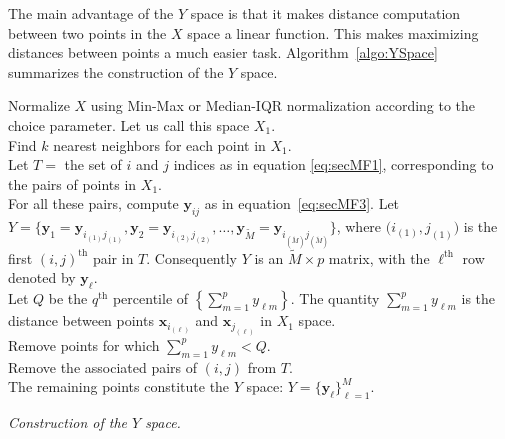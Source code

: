 \documentclass[letter,12pt]{article}
\begin{document}
The main advantage of the $Y$ space is that it makes distance computation between two points in the $X$ space a linear function. This makes maximizing distances between points a much easier task.
Algorithm~\ref{algo:YSpace} summarizes the construction of the $Y$ space.

\DontPrintSemicolon
\begin{algorithm}\fontsize{11}{12}\selectfont
	Normalize $X$ using { \color{blue} Min-Max or Median-IQR normalization according to the choice parameter}. Let us call this space $X_1$. \\
	{ \color{blue}Find $k$ nearest neighbors for each point in $X_1$.} \\
	Let $T = $ the set of $i$ and $j$ indices { \color{blue} as in equation \eqref{eq:secMF1}},  corresponding to the pairs of points in $X_1$. \\
	{ \color{blue} For all these pairs, compute $\bm{y}_{ij}$ as in equation~\eqref{eq:secMF3}.} Let $Y =\big\{ \bm{y}_{1} =\bm{y}_{i_{(1)}j_{(1)}} , \bm{y}_{2} =\bm{y}_{i_{(2)}j_{(2)}}, \dots, \bm{y}_{\tilde{M}} =\bm{y}_{i_{(\tilde{M})}j_{(\tilde{M})}} \big\}$, where $\big( i_{(1)},j_{(1)} \big)$ is the first $(i, j)^{\text{th}}$ pair in $T$. Consequently $Y$ is an $\tilde{M}\times p$ matrix, with the $\ell^{\text{th}}$ row denoted by $\bm{y}_\ell$.\\
	Let $Q$ be the $q^{\text{th}}$ percentile of $ \left\{\sum_{m=1}^p {y}_{\ell m}\right\}$. The quantity $\sum_{m=1}^p {y}_{\ell m}$ is the distance between points $\bm{x}_{i_{(\ell)}}$ and $\bm{x}_{j_{(\ell)}}$ in $X_1$ space. \\
	Remove points for which $ \sum_{m=1}^p {y}_{\ell m} < Q $. \\
	Remove the associated pairs of $(i, j)$ from $T$. \\
	The remaining points constitute the $Y$ space: $Y = \{\bm{y}_\ell \}_{\ell=1}^M$.
	\caption{\itshape Construction of the $Y$ space.}
	\label{algo:YSpace}
\end{algorithm}
\end{document}
